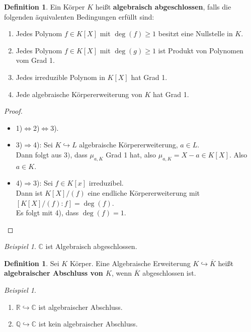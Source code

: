 \documentclass[10pt,a4paper]{article}
\newcommand{\Q}{\ensuremath{\mathbb{Q}}}
\newcommand{\R}{\ensuremath{\mathbb{R}}}
\newcommand{\C}{\ensuremath{\mathbb{C}}}
\newcommand{\ol}[1]{\overline{#1}}
\newcounter{thm}[section]
\theoremstyle{definition}
\newtheorem{definition}[thm]{Definition}
\theoremstyle{plain}
\theoremstyle{remark}
\newtheorem{exm}[thm]{Beispiel}
\newtheorem*{exm*}{Beispiel}
\begin{document}
\begin{definition}
	Ein Körper $K$ heißt \textbf{algebraisch abgeschlossen}, falls die folgenden äquivalenten Bedingungen erfüllt sind:
	\begin{enumerate}
		\item Jedes Polynom $f\in K[X]$ mit $\deg(f)\geq 1$ besitzt eine Nullstelle in $K$.
		\item Jedes Polynom $f\in K[X]$ mit $\deg(g)\geq 1$ ist Produkt von Polynomen vom Grad 1.
		\item Jedes irreduzible Polynom in $K[X]$ hat Grad 1.
		\item Jede algebraische Körpererweiterung von $K$ hat Grad 1.
	\end{enumerate}
\end{definition}
\begin{proof}
	\begin{itemize}
		\item 1)$\Leftrightarrow$2)$\Leftrightarrow$3).
		\item 3)$\Rightarrow$4): Sei $K\hookrightarrow L$ algebraische Körpererweiterung, $a\in L$.\\
		Dann folgt aus $3)$, dass $\mu_{a,K}$ Grad 1 hat, also $\mu_{a,K}=X-a\in K[X]$. Also $a\in K$.
		\item 4)$\Rightarrow$3): Sei $f\in K[x]$ irreduzibel.\\
		Dann ist $K[X]/(f)$ eine endliche Körpererweiterung mit $[K[X]/(f):f]=\deg(f)$.\\
		Es folgt mit 4), dass $\deg(f)=1$.
	\end{itemize}
\end{proof}

\begin{exm}
	$\C$ ist Algebraisch abgeschlossen.
\end{exm}
\begin{definition}
	Sei $K$ Körper. Eine Algebraische Erweiterung $K\hookrightarrow \ol K$ heißt \textbf{algebraischer Abschluss von $K$}, wenn $\ol K$ abgeschlossen ist.
\end{definition}
\begin{exm*}
	\begin{enumerate}
		\item $\R\hookrightarrow \C$ ist algebraischer Abschluss.
		\item $\Q\hookrightarrow \C$ ist kein algebraischer Abschluss.
	\end{enumerate}
\end{exm*}
\end{document}

